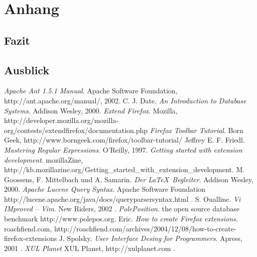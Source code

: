 
\chapter{Anhang}
\section{Fazit}
\section{Ausblick}



\begin{thebibliography}{keine ah}

\bibitem[Apa02]{} \emph{Apache Ant 1.5.1 Manual}. Apache Software Foundation, http://ant.apache.org/manual/, 2002.
\bibitem[Dat00]{} C. J. Date. \emph{An Introduction to Database Systems}. Addison Wesley, 2000.
\bibitem[ExFF]{} \emph{Extend Firefox}. Mozilla, http://developer.mozilla.org/mozilla-org/contests/extendfirefox/documentation.php
\bibitem[FFTT]{} \emph{Firefox Toolbar Tutorial}. Born Geek, http://www.borngeek.com/firefox/toolbar-tutorial/
\bibitem[Fri97]{} Jeffrey E. F. Friedl. \emph{Mastering Regular Expressions}. O'Reilly, 1997.
\bibitem[Gswed]{} \emph{Getting started with extension development}. mozillaZine, http://kb.mozillazine.org/Getting\_started\_with\_extension\_development.
\bibitem[Goo00]{} M. Goossens, F. Mittelbach und A. Samarin. \emph{Der \LaTeX \ Begleiter}. Addison Wesley, 2000.
\bibitem[LucQS]{} \emph{Apache Lucene Query Syntax}. Apache Software Foundation http://lucene.apache.org/java/docs/queryparsersyntax.html .
\bibitem[Oua02]{} S. Oualline. \emph{Vi IMproved -- Vim}. New Riders, 2002 .
\bibitem[PolPos]{} \emph{PolePosition}. the open source database benchmark http://www.polepos.org.
\bibitem[Roac04]{} Eric. \emph{How to create Firefox extensions}. roachfiend.com, http://roachfiend.com/archives/2004/12/08/how-to-create-firefox-extensions
\bibitem[Spo01]{} J. Spolsky. \emph{User Interface Desing for Programmers}. Apress, 2001 .
\bibitem[XULPL]{} \emph{XUL Planet} XUL Planet, http://xulplanet.com .

\end{thebibliography}

